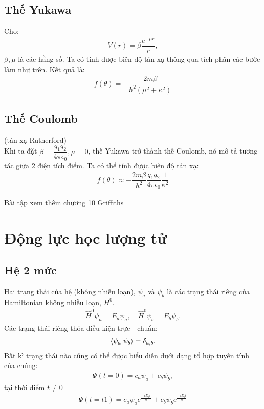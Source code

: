 \documentclass{report}
\newcommand{\f}[2]{\dfrac{#1}{#2}}
\begin{document}
\section{Thế Yukawa}
Cho:
\begin{align}
	V(r) = \beta \f{e^{-\mu r}}{r},
\end{align}
$\beta,\mu$ là các hằng số. Ta có tính được biên độ tán xạ thông qua tích phân các bước làm như trên. Kết quả là:
\begin{align}
	f(\theta) = -\f{2m\beta}{\hbar^2\left(\mu^2 + \kappa^2\right)}
\end{align}
\section{Thế Coulomb}(tán xạ Rutherford)\\
Khi ta đặt $\beta = \f{q_1 q_2}{4\pi\epsilon_0},\mu = 0$, thế Yukawa trở thành thế Coulomb, nó mô tả tương tác giữa 2 điện tích điểm. Ta có thể tính được biên độ tán xạ:
\begin{align}
	f(\theta) \approx  -\f{2m\beta}{\hbar^2} \f{q_1 q_2}{4\pi\epsilon_0}\f{1}{\kappa^2}
\end{align}

Bài tập xem thêm chương 10 Griffiths

\chapter{Động lực học lượng tử}
\section{Hệ 2 mức}
Hai trạng thái của hệ (không nhiễu loạn), $\psi_a$ và $\psi_b$ là các trạng thái riêng của Hamiltonian không nhiễu loạn, $H^0$.
\begin{align}
	\hat{H}^0\psi_a = E_a\psi_a ,\quad \hat{H}^0\psi_b = E_b\psi_b.
\end{align}\label{eq2.1}
Các trạng thái riêng thỏa điều kiện trực - chuẩn:
\begin{align}
	\braket{\psi_a}{\psi_b} = \delta_{a,b}.
\end{align}
Bất kì trạng thái nào cũng có thể được biểu diễn dưới dạng tổ hợp tuyến tính của chúng:
\begin{align}
	\Psi(t = 0) = c_a\psi_a + c_b\psi_b,
\end{align}
tại thời điểm $t\neq0$
\begin{align}
	\Psi(t = t1) = c_a\psi_a e^{\frac{-i E_a t}{\hbar}} + c_b\psi_b e^{\frac{-i E_b t}{\hbar}} 
\end{align}\label{eq2.4}
\end{document}

